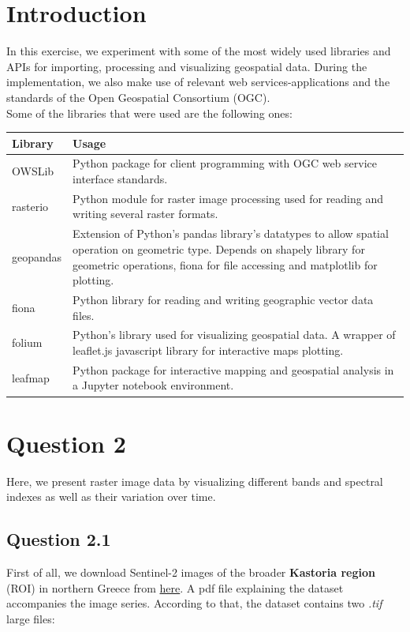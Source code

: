 \section{Introduction}
In this exercise, we experiment with some of the most widely used libraries and APIs for importing, processing and visualizing geospatial data. During the implementation, we also make use of relevant web services-applications and the standards of the Open Geospatial Consortium (OGC). \\

Some of the libraries that were used are the following ones:\\

\begin{tabular}{ | p{1.5cm} | p{7cm}| } 
  \hline
  Library & Usage \\
  \hline
  OWSLib & Python package for client programming with OGC web service interface standards.\\
  \hline
  rasterio & Python module for raster image processing used for reading and writing several raster formats. \\ 
  \hline
  geopandas & Extension of Python's pandas library's datatypes to allow spatial operation on geometric type. Depends on shapely library for geometric operations, fiona for file accessing and matplotlib for plotting.\\ 
  \hline
  fiona & Python library for reading and writing geographic vector data files. \\ 
  \hline
  folium & Python's library used for visualizing geospatial data. A wrapper of leaflet.js javascript library for interactive maps plotting. \\ 
  \hline
  leafmap & Python package for interactive mapping and geospatial analysis in a Jupyter notebook environment.\\
  \hline
\end{tabular}


\section{Question 2}
Here, we present raster image data by visualizing different bands and spectral indexes as well as their variation over time.  
\subsection{ Question 2.1}
First of all, we download Sentinel-2 images of the broader \textbf{Kastoria region} (ROI) in northern Greece from \href{https://pithos.okeanos.grnet.gr/public/fBSNLJeNxerluMj2MVDqF}{here}. A pdf file explaining the dataset accompanies the image series. According to that, the dataset contains two \emph{.tif} large files:

